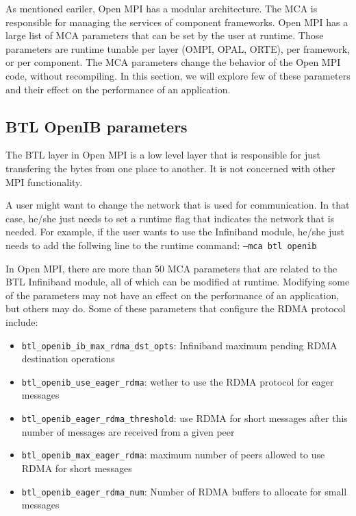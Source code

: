 As mentioned eariler, Open MPI has a modular architecture. The MCA is
responsible for managing the services of component frameworks. Open MPI has a
large list of MCA parameters that can be set by the user at runtime. Those
parameters are runtime tunable per layer (OMPI, OPAL, ORTE), per framework, or
per component. The MCA parameters change the behavior of the Open MPI code,
without recompiling. In this section, we will explore few of these parameters
and their effect on the performance of an application.

\subsection{BTL OpenIB parameters}
The BTL layer in Open MPI is a low level layer that is responsible for just
transfering the bytes from one place to another. It is not concerned with
other MPI functionality. 

A user might want to change the network that is used for communication. In
that case, he/she just needs to set a runtime flag that indicates the network
that is needed. For example, if the user wants to use the Infiniband module,
he/she just needs to add the follwing line to the runtime command: 
{\tt --mca btl openib}

In Open MPI, there are more than 50 MCA parameters that are related to the BTL
Infiniband module, all of which can be modified at runtime. Modifying some of
the parameters may not have an effect on the performance of an application,
but others may do.
Some of these parameters that configure the RDMA \cite{rdma} protocol include:
\begin{itemize}
\item {\tt btl\_openib\_ib\_max\_rdma\_dst\_opts}: Infiniband maximum pending
  RDMA destination operations
\item {\tt btl\_openib\_use\_eager\_rdma}: wether to use the RDMA protocol for
  eager messages
\item {\tt btl\_openib\_eager\_rdma\_threshold}: use RDMA for short messages
  after this number of messages are received from a given peer
\item {\tt btl\_openib\_max\_eager\_rdma}: maximum number of peers allowed to
  use RDMA for short messages 
\item {\tt btl\_openib\_eager\_rdma\_num}: Number of RDMA buffers to allocate
  for small messages 
\end{itemize}

